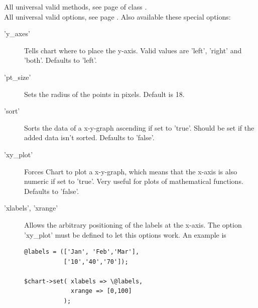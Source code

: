 \Methods
All universal valid methods, see page \pageref{methods} of class . \\[\parabstand]
%
\Attributes
All universal valid options, see page \pageref{options}. 
Also available these special options:
\begin{description}
\item['y\_axes'] Tells chart where to place the y-axis. 
                 Valid values are 'left', 'right' and 'both'. Defaults to 'left'.
                 
\item['pt\_size'] Sets the radius of the points in pixels. Default is 18.

\item['sort'] Sorts the data of a x-y-graph ascending if set to 'true'. 
              Should be set if the added data isn't sorted. Defaults to 'false'.
              
\item['xy\_plot'] Forces Chart to plot a x-y-graph, 
                  which means that the x-axis is also numeric if set to 'true'. 
                   Very useful for plots of mathematical functions. Defaults to 'false'.

\item['xlabels', 'xrange'] Allows the arbitrary positioning of the labels at the
                  x-axis. The option 'xy\_plot' must be defined to let this
                  options work. An example is
                  \begin{verbatim}
@labels = (['Jan', 'Feb','Mar'], 
           ['10','40','70']); 

$chart->set( xlabels => \@labels, 
             xrange => [0,100] 
           ); 
                   \end{verbatim}

\end{description}
